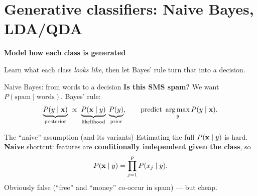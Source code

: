 \documentclass[aspectratio=169]{beamer}
\newcommand{\sectiontransition}[2]{%
  \begin{frame}[plain]
    \vfill
    \begin{center}
      {\Large\color{popblue}\textbf{#1}}\\[0.9em]
      \begin{minipage}{0.82\textwidth}\centering\small #2 \end{minipage}
    \end{center}
    \vfill
  \end{frame}}
\begin{document}
\section{Generative classifiers: Naive Bayes, LDA/QDA}
\sectiontransition{Model how each class is generated}{Learn what each class \emph{looks like},
then let Bayes' rule turn that into a decision.}

\begin{frame}{Naive Bayes: from words to a decision}
  \textbf{Is this SMS spam?} We want $P(\text{spam}\mid \text{words})$. Bayes' rule:
  \[
    \underbrace{P(y \mid \mathbf{x})}_{\text{posterior}} \;\propto\;
    \underbrace{P(\mathbf{x} \mid y)}_{\text{likelihood}}\;\underbrace{P(y)}_{\text{prior}},
    \qquad \text{predict } \mathop{\mathrm{arg\,max}}_y P(y \mid \mathbf{x}).
  \]
\end{frame}

\begin{frame}{The ``naive'' assumption (and its variants)}
  Estimating the full $P(\mathbf{x} \mid y)$ is hard. \textbf{Naive} shortcut: features are
  \textbf{conditionally independent given the class}, so
  \[
    P(\mathbf{x} \mid y) = \prod_{j=1}^{p} P(x_j \mid y).
  \]
  Obviously false (``free'' and ``money'' co-occur in spam) --- but cheap.
  \vfill
\end{frame}
\end{document}
